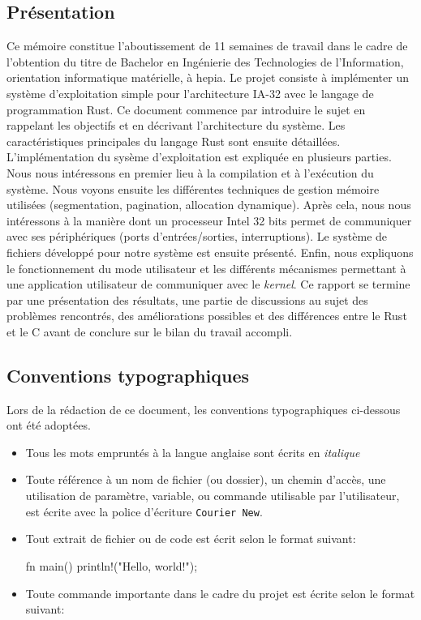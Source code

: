 \documentclass[a4paper, 12pt]{article}
\begin{document}
\subsection*{Présentation}
Ce mémoire constitue l'aboutissement de 11 semaines de travail dans le cadre de
l'obtention du titre de Bachelor en Ingénierie des Technologies de l'Information,
orientation informatique matérielle, à hepia. Le projet consiste à implémenter
un système d'exploitation simple pour l'architecture \acrshort{IA-32} avec le langage
de programmation Rust. Ce document commence par introduire le sujet en rappelant
les objectifs et en décrivant l'architecture du système. Les caractéristiques principales
du langage Rust sont ensuite détaillées. L'implémentation du sysème d'exploitation
est expliquée en plusieurs parties. Nous nous intéressons en premier lieu à la
compilation et à l'exécution du système. Nous voyons ensuite les différentes techniques
de gestion mémoire utilisées (segmentation, pagination, allocation dynamique).
Après cela, nous nous intéressons à la manière dont un processeur Intel 32 bits
permet de communiquer avec ses périphériques (ports d'entrées/sorties, interruptions).
Le système de fichiers développé pour notre système est ensuite présenté. Enfin,
nous expliquons le fonctionnement du mode utilisateur et les différents mécanismes
permettant à une application utilisateur de communiquer avec le \textit{kernel}.
Ce rapport se termine par une présentation des résultats, une partie de discussions
au sujet des problèmes rencontrés, des améliorations possibles et des différences
entre le Rust et le C avant de conclure sur le bilan du travail accompli.

\subsection*{Conventions typographiques}
Lors de la rédaction de ce document, les conventions typographiques ci-dessous ont
été adoptées.
\begin{itemize}[label=\textbullet]
	\item Tous les mots empruntés à la langue anglaise sont écrits en \textit{italique}
	\item Toute référence à un nom de fichier (ou dossier), un chemin d’accès, une 
    utilisation de paramètre, variable, ou commande utilisable par l’utilisateur, 
    est écrite avec la police d’écriture \texttt{Courier New}.
	\item Tout extrait de fichier ou de code est écrit selon le format suivant:
\begin{rustcode}
fn main() {
    println!("Hello, world!");
}
\end{rustcode}
    \item Toute commande importante dans le cadre du projet est écrite selon le
    format suivant:
\end{itemize}
\end{document}
